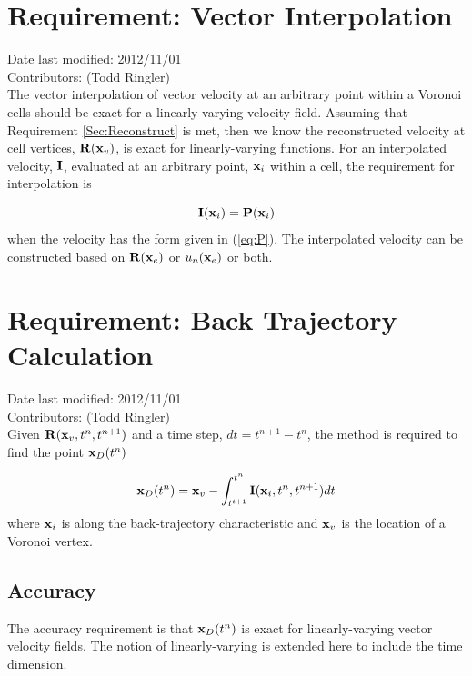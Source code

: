 \documentclass[11pt]{report}
\begin{document}
\section{Requirement: Vector Interpolation}
\label{Sec:Interpolate}
Date last modified: 2012/11/01 \\
Contributors: (Todd Ringler) \\

The vector interpolation of vector velocity at an arbitrary point within a Voronoi cells should be exact for a linearly-varying velocity field. Assuming that Requirement \ref{Sec:Reconstruct} is met, then we know the reconstructed velocity at cell vertices, ${\bf R}({\bf x}_v)$, is exact for linearly-varying functions. For an interpolated velocity, ${\bf I}$, evaluated at an arbitrary point, ${\bf x}_i$ within a cell, the requirement for interpolation is

\begin{equation}
{\bf I}({\bf x}_i) = {\bf P}({\bf x}_i)
\end{equation}
when the velocity has the form given in (\ref{eq:P}). The interpolated velocity can be constructed based on ${\bf R}({\bf x}_e)$ or $u_n({\bf x}_e)$ or both.

\section{Requirement: Back Trajectory Calculation}
\label{Sec:BackTrajectories}
Date last modified: 2012/11/01 \\
Contributors: (Todd Ringler) \\

Given ${\bf R}({\bf x}_v,t^n,t^{n+1})$ and a time step, $dt=t^{n+1}-t^n$, the method is required to find the point ${\bf x}_D(t^n)$

\begin{equation}
\label{eq:backtrajectory}
{\bf x}_D(t^n) = {\bf x}_v - \int_{t^{t+1}}^{t^n} {\bf I}({\bf x}_i,t^n,t^{n+1}) dt
\end{equation}
where ${\bf x}_i$ is along the back-trajectory characteristic and ${\bf x}_v$ is the location of a Voronoi vertex.

\subsection{Accuracy}
The accuracy requirement is that ${\bf x}_D(t^n)$ is exact for linearly-varying vector velocity fields. The notion of linearly-varying is extended here to include the time dimension.
\end{document}
